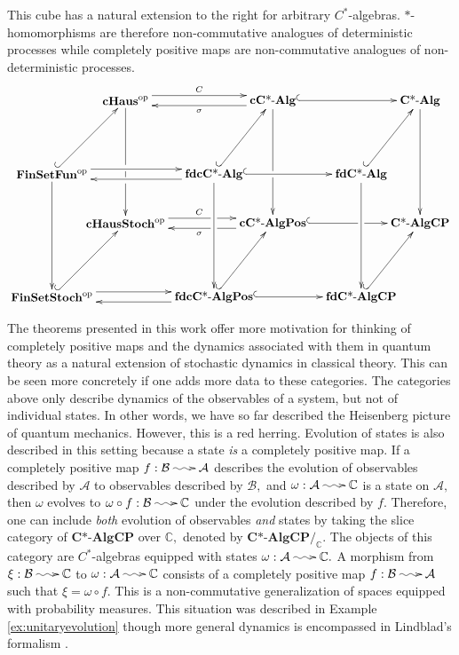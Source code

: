 \documentclass[12pt]{article}
\makeatletter
\edef\t{\pgfmathresult}%
\theoremstyle{theorem}
\theoremstyle{definition}
\numberwithin{equation}{section}
\let\s=\sigma \let\t=\tau \let\u=\upsilon \let\f=\phi \let\c=\chi
\let\w=\omega      \let\G=\Gamma \let\D=\Delta \let\Q=\Theta \let\L=\Lambda
\let\C=\Chi \let\W=\Omega
\newcommand{\be}{\begin{equation}}
\newcommand{\ee}{\end{equation}}
\newcommand{\<}{\langle}
\renewcommand{\>}{\rangle}
\def\C{{{\mathbb C}}}
\def\Q{{{\mathbb Q}}}
\newcommand{\CAlg}{\mathbf{C\text{*-}Alg}}
\newcommand{\CPCAlg}{\mathbf{C\text{*-}AlgCP}}
\newcommand{\CPfdCAlg}{\mathbf{fdC\text{*-}AlgCP}}
\newcommand{\cCAlg}{\mathbf{cC\text{*-}Alg}}
\newcommand{\fdcCAlg}{\mathbf{fdcC\text{*-}Alg}}
\newcommand{\fdCAlg}{\mathbf{fdC\text{*-}Alg}}
\newcommand{\cCAlgPos}{\mathbf{cC\text{*-}AlgPos}}
\newcommand{\fdcCAlgPos}{\mathbf{fdcC\text{*-}AlgPos}}
\def\mA{{{\mathcal{A}}}}
\def\mB{{{\mathcal{B}}}}
\newcommand{\FinSetFun}{\mathbf{FinSetFun}}
\newcommand{\FinSetStoch}{\mathbf{FinSetStoch}}
\newcommand{\op}{\mathrm{op}}
\newcommand{\cH}{\mathbf{cHaus}}
\newcommand{\cHStoch}{\mathbf{cHausStoch}}
\newcommand{\stoch}{\;\xy0;/r.25pc/:\ar@{~>}(3,0);(-3,0);\endxy\;}
\makeatother
\begin{document}
This cube has a natural extension to the right for
arbitrary $C^*$-algebras. $*$-homomorphisms are therefore
non-commutative analogues of deterministic processes
while completely positive maps are non-commutative analogues of 
non-deterministic processes. 
\be
\xy0;/r.35pc/:
(-15,20)*+{\cH^{\op}}="cHaus";
(-15,-5)*+{\cHStoch^{\op}}="cHausStoch";
(15,20)*+{\cCAlg}="cCAlg";
(15,-5)*+{\cCAlgPos}="cCAlgPos";
(-30,5)*+{\FinSetFun^{\op}}="FinSetFun";
(-30,-20)*+{\FinSetStoch^{\op}}="FinSetStoch";
(3,5)*+{\fdcCAlg}="fdcCAlg";
(3,-20)*+{\fdcCAlgPos}="fdcCAlgPos";
(45,20)*+{\CAlg}="CAlg";
(45,-5)*+{\CPCAlg}="CPCAlg";
(33,5)*+{\fdCAlg}="fdCAlg";
(33,-20)*+{\CPfdCAlg}="fdCAlgPos";
{\ar@<1.0ex>"cHaus";"cCAlg"^{C}};
{\ar@<1.0ex>"cCAlg";"cHaus"^{\s}};
{\ar@<1.0ex>|(0.6){\hole}"cHausStoch";"cCAlgPos"^{C}};
{\ar@<1.0ex>|(0.4){\hole}"cCAlgPos";"cHausStoch"^{\s}};
{\ar@<1.0ex>"FinSetFun";"fdcCAlg"};
{\ar@<1.0ex>"fdcCAlg";"FinSetFun"};
{\ar@<1.0ex>"FinSetStoch";"fdcCAlgPos"};
{\ar@<1.0ex>"fdcCAlgPos";"FinSetStoch"};
{\ar@{^{(}->}"FinSetFun";"cHaus"};
{\ar@{^{(}->}"FinSetStoch";"cHausStoch"};
{\ar@{^{(}->}"fdcCAlg";"cCAlg"};
{\ar@{^{(}->}"fdcCAlgPos";"cCAlgPos"};
{\ar@{^{(}->}"cCAlg";"CAlg"};
{\ar@{^{(}->}"fdcCAlg";"fdCAlg"};
{\ar@{^{(}->}|(0.6){\hole}"cCAlgPos";"CPCAlg"};
{\ar@{^{(}->}"fdcCAlgPos";"fdCAlgPos"};
{\ar@{^{(}->}"fdCAlg";"CAlg"};
{\ar@{^{(}->}"fdCAlgPos";"CPCAlg"};
{\ar"FinSetFun";"FinSetStoch"};
{\ar|(0.55){\hole}|(0.65){\hole}"cHaus";"cHausStoch"};
{\ar"fdcCAlg";"fdcCAlgPos"};
{\ar|(0.6){\hole}"cCAlg";"cCAlgPos"};
{\ar"fdCAlg";"fdCAlgPos"};
{\ar"CAlg";"CPCAlg"};
\endxy
\ee

The theorems presented in this work offer more motivation
for thinking of completely positive maps and the dynamics
associated with them in quantum theory as a natural extension of 
stochastic dynamics in classical theory.
This can be seen more concretely if one adds more data to these categories. 
The categories above only describe dynamics of the observables of a
system, but not of individual states. In other words, we have so far
described the Heisenberg picture of quantum mechanics. 
However, this is a red herring. Evolution of states is also described
in this setting because a state \emph{is} a completely positive map. 
If a completely positive map $f:\mB\stoch\mA$ describes the evolution of
observables described by $\mA$ to observables described by $\mB,$
and $\w:\mA\stoch\C$ is a state on $\mA,$ then $\w$ evolves to 
$\w\circ f:\mB\stoch\C$ under the evolution described by $f.$ 
Therefore, one can include \emph{both} evolution of observables \emph{and}
states by taking
the slice category of $\CPCAlg$ over $\C,$ denoted by 
$\CPCAlg/_{\C}.$ The objects of this category are 
$C^*$-algebras equipped with states $\w:\mA\stoch\C.$
A morphism from $\xi:\mB\stoch\C$ to $\w:\mA\stoch\C$ consists of a
completely positive map $f:\mB\stoch\mA$ such that $\xi=\w\circ f.$ 
This is a non-commutative generalization of spaces equipped with 
probability measures. 
This situation was described in Example \ref{ex:unitaryevolution}
though more general dynamics is encompassed in Lindblad's formalism \cite{Li76}.
\end{document}
